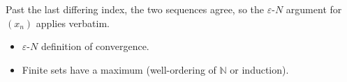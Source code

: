 \begin{remark*}
Past the last differing index, the two sequences agree, so the $\varepsilon$-$N$ argument for $(x_n)$ applies verbatim.
\end{remark*}

\begin{remark*}[Dependencies]
\begin{itemize}
  \item $\varepsilon$-$N$ definition of convergence.
  \item Finite sets have a maximum (well-ordering of $\mathbb{N}$ or induction).
\end{itemize}
\end{remark*}
